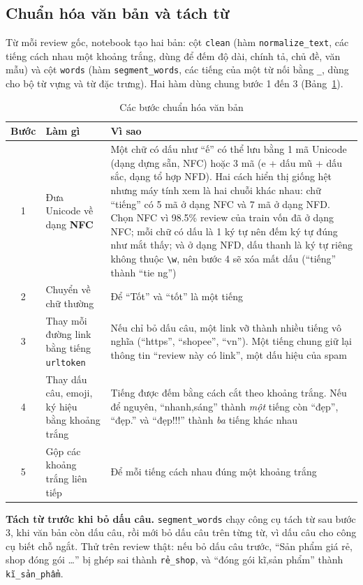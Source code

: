 \subsection{Chuẩn hóa văn bản và tách từ}
\label{sec:text-normalize}
Từ mỗi review gốc, notebook tạo hai bản: cột \texttt{clean} (hàm \texttt{normalize\_text}, các tiếng cách nhau một khoảng trắng,
dùng để đếm độ dài, chính tả, chủ đề, văn mẫu) và cột \texttt{words} (hàm \texttt{segment\_words}, các tiếng của một từ nối bằng
\texttt{\_}, dùng cho bộ từ vựng và từ đặc trưng). Hai hàm dùng chung bước 1 đến 3 (Bảng~\ref{tab:text-steps}).

\begin{table}[H]
\centering
\caption{Các bước chuẩn hóa văn bản}
\label{tab:text-steps}
\small
\begin{tabular}{c>{\raggedright\arraybackslash}p{4.0cm}>{\raggedright\arraybackslash}p{10.0cm}}
\toprule
Bước & Làm gì & Vì sao\\
\midrule
1 & Đưa Unicode về dạng \textbf{NFC} & Một chữ có dấu như ``ế'' có thể lưu bằng 1 mã Unicode (dạng dựng sẵn, NFC) hoặc 3 mã (e + dấu mũ + dấu sắc, dạng tổ hợp NFD). Hai cách hiển thị giống hệt nhưng máy tính xem là hai chuỗi khác nhau: chữ ``tiếng'' có 5 mã ở dạng NFC và 7 mã ở dạng NFD. Chọn NFC vì 98.5\% review của train vốn đã ở dạng NFC; mỗi chữ có dấu là 1 ký tự nên đếm ký tự đúng như mắt thấy; và ở dạng NFD, dấu thanh là ký tự riêng không thuộc \texttt{\textbackslash w}, nên bước 4 sẽ xóa mất dấu (``tiếng'' thành ``tie ng'')\\
2 & Chuyển về chữ thường & Để ``Tốt'' và ``tốt'' là một tiếng\\
3 & Thay mỗi đường link bằng tiếng \texttt{urltoken} & Nếu chỉ bỏ dấu câu, một link vỡ thành nhiều tiếng vô nghĩa (``https'', ``shopee'', ``vn''). Một tiếng chung giữ lại thông tin ``review này có link'', một dấu hiệu của spam\\
4 & Thay dấu câu, emoji, ký hiệu bằng khoảng trắng & Tiếng được đếm bằng cách cắt theo khoảng trắng. Nếu để nguyên, ``nhanh,sáng'' thành \emph{một} tiếng còn ``đẹp'', ``đẹp.'' và ``đẹp!!!'' thành \emph{ba} tiếng khác nhau\\
5 & Gộp các khoảng trắng liên tiếp & Để mỗi tiếng cách nhau đúng một khoảng trắng\\
\bottomrule
\end{tabular}
\end{table}

\textbf{Tách từ trước khi bỏ dấu câu.} \texttt{segment\_words} chạy công cụ tách từ sau bước 3, khi văn bản còn dấu câu, rồi mới bỏ
dấu câu trên từng từ, vì dấu câu cho công cụ biết chỗ ngắt. Thử trên review thật: nếu bỏ dấu câu trước, ``Sản phẩm giá rẻ, shop đóng gói \ldots''
bị ghép sai thành \texttt{rẻ\_shop}, và ``đóng gói kĩ,sản phẩm'' thành \texttt{kĩ\_sản\_phẩm}.

